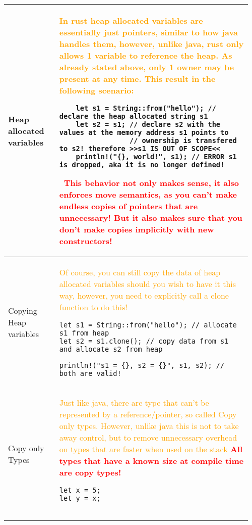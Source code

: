 \documentclass[main.tex,fontsize=8pt,paper=a4,paper=portrait,DIV=calc,]{scrartcl}
\begin{document}
\begin{table}[ht!]
\begin{tabular}{|m{0.2\linewidth}|m{0.755\linewidth}|}
Heap allocated variables & 
\textcolor{orange}{In rust heap allocated variables are essentially just pointers, similar to how java handles them, however, unlike java, rust only allows 1 variable to reference the heap.\newline
As already stated above, only 1 owner may be present at any time.\newline
This result in the following scenario:}\newline
\begin{lstlisting}
    let s1 = String::from("hello"); // declare the heap allocated string s1
    let s2 = s1; // declare s2 with the values at the memory address s1 points to
                 // ownership is transfered to s2! therefore >>s1 IS OUT OF SCOPE<<
    println!("{}, world!", s1); // ERROR s1 is dropped, aka it is no longer defined!
\end{lstlisting}
\, \newline
\textcolor{red}{This behavior not only makes sense, it also enforces move semantics, as you can't make endless copies of pointers that are unnecessary! \newline
But it also makes sure that you don't make copies implicitly with new constructors!}\\
\hline
Copying Heap variables & 
\textcolor{orange}{Of course, you can still copy the data of heap allocated variables should you wish to have it this way, however, you need to explicitly call a clone function to do this!}\newline
\begin{lstlisting}
let s1 = String::from("hello"); // allocate s1 from heap
let s2 = s1.clone(); // copy data from s1 and allocate s2 from heap

println!("s1 = {}, s2 = {}", s1, s2); // both are valid!
\end{lstlisting}\\
\hline 
Copy only Types & 
\textcolor{orange}{Just like java, there are type that can't be represented by a reference/pointer, so called Copy only types.\newline
However, unlike java this is not to take away control, but to remove unnecessary overhead on types that are faster when used on the stack\newline}
\textcolor{red}{\textbf{All types that have a known size at compile time are copy types!}}\newline
\begin{lstlisting}
let x = 5;
let y = x;


\end{lstlisting}
\end{tabular}
\end{table}
\end{document}
